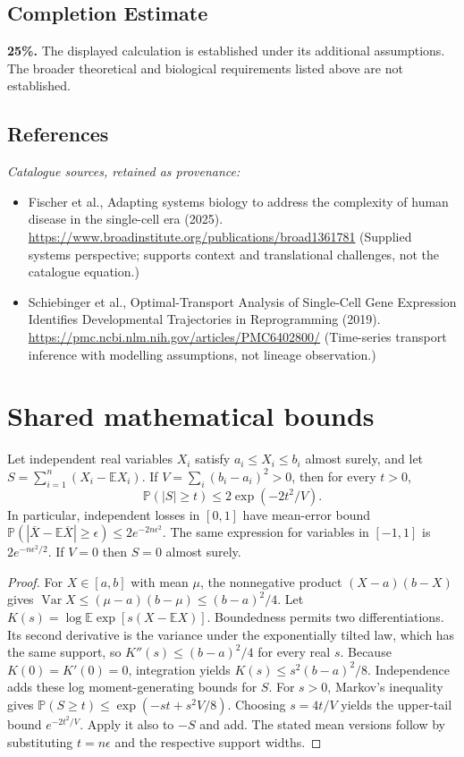 \documentclass[11pt]{article}
\begin{document}
\subsection{Completion Estimate}
\textbf{25\%.} The displayed calculation is established under its additional assumptions. The broader theoretical and biological requirements listed above are not established.
\subsection{References}
\noindent\emph{Catalogue sources, retained as provenance:}
\begin{itemize}
\item Fischer et al., Adapting systems biology to address the complexity of human disease in the single-cell era (2025). \url{https://www.broadinstitute.org/publications/broad1361781} (Supplied systems perspective; supports context and translational challenges, not the catalogue equation.)
\item Schiebinger et al., Optimal-Transport Analysis of Single-Cell Gene Expression Identifies Developmental Trajectories in Reprogramming (2019). \url{https://pmc.ncbi.nlm.nih.gov/articles/PMC6402800/} (Time-series transport inference with modelling assumptions, not lineage observation.)
\end{itemize}




\section{Shared mathematical bounds}\label{app:bounds}
\begin{lemma}\label{lem:bounded}
Let independent real variables $X_i$ satisfy $a_i\leq X_i\leq b_i$ almost surely,
and let $S=\sum_{i=1}^n(X_i-\mathbb{E} X_i)$. If
$V=\sum_i(b_i-a_i)^2>0$, then for every $t>0$,
\[
 \mathbb{P}(|S|\geq t)\leq 2\exp(-2t^2/V).
\]
In particular, independent losses in $[0,1]$ have mean-error bound
$\mathbb{P}(|\overline X-\mathbb{E}\overline X|\geq\epsilon)
\leq2e^{-2n\epsilon^2}$. The same expression for variables in $[-1,1]$
is $2e^{-n\epsilon^2/2}$. If $V=0$ then $S=0$ almost surely.
\end{lemma}
\begin{proof}
For $X\in[a,b]$ with mean $\mu$, the nonnegative product
$(X-a)(b-X)$ gives
$\operatorname{Var} X\leq(\mu-a)(b-\mu)\leq(b-a)^2/4$.
Let $K(s)=\log\mathbb{E}\exp[s(X-\mathbb{E} X)]$.
Boundedness permits two differentiations. Its second derivative is the variance
under the exponentially tilted law, which has the same support, so
$K''(s)\leq(b-a)^2/4$ for every real $s$.
Because $K(0)=K'(0)=0$, integration yields
$K(s)\leq s^2(b-a)^2/8$.
Independence adds these log moment-generating bounds for $S$.
For $s>0$, Markov's inequality gives
$\mathbb{P}(S\geq t)\leq\exp(-st+s^2V/8)$.
Choosing $s=4t/V$ yields the upper-tail bound $e^{-2t^2/V}$.
Apply it also to $-S$ and add. The stated mean versions follow by substituting
$t=n\epsilon$ and the respective support widths.
\end{proof}
\end{document}
